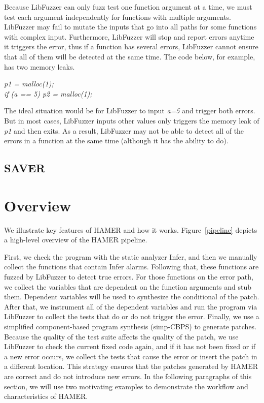 \documentclass[a4paper,11pt,oneside,openany]{book}
\begin{document}
Because LibFuzzer can only fuzz test one function argument at a time, we must test each argument independently for functions with multiple arguments. LibFuzzer may fail to mutate the inputs that go into all paths for some functions with complex input. Furthermore, LibFuzzer will stop and report errors anytime it triggers the error, thus if a function has several errors, LibFuzzer cannot ensure that all of them will be detected at the same time. The code below, for example, has two memory leaks. 


\begin{minipage}{\textwidth}
    \vspace{0.2cm}
    \textsl{\hspace{0.3cm}p1 = malloc(1);\\\hspace{0.3cm}if (a == 5) p2 = malloc(1);\\}
\end{minipage}
The ideal situation would be for LibFuzzer to input {\it a=5} and trigger both errors. But in most cases,  LibFuzzer inputs other values only triggers the memory leak of {\it p1} and then exits. As a result, LibFuzzer may not be able to detect all of the errors in a function at the same time (although it has the ability to do).


\section{SAVER}

\chapter{Overview}
\label{overview}
We illustrate key features of HAMER and how it works. Figure~\ref{pipeline} depicts a high-level overview of the HAMER pipeline.

First, we check the program with the static analyzer \mbox{Infer}, and then we manually collect the functions that contain Infer alarms. Following that, these functions are fuzzed by LibFuzzer to detect true errors.  For those functions on the error path, we collect the variables that are dependent on the function arguments and stub them. Dependent variables will be used to synthesize the conditional of the patch. After that, we instrument all of the dependent variables and run the program via LibFuzzer to collect the tests that do or do not trigger the error. Finally, we use a simplified component-based program synthesis (simp-CBPS) to generate patches. Because the quality of the test suite affects the quality of the patch, we use LibFuzzer to check the current fixed code again, and if it has not been fixed or if a new error occurs, we collect the tests that cause the error or insert the patch in a different location. This strategy ensures that the patches generated by HAMER are correct and do not introduce new errors. In the following paragraphs of this section, we will use two motivating examples to demonstrate the workflow and characteristics of HAMER.
\end{document}
